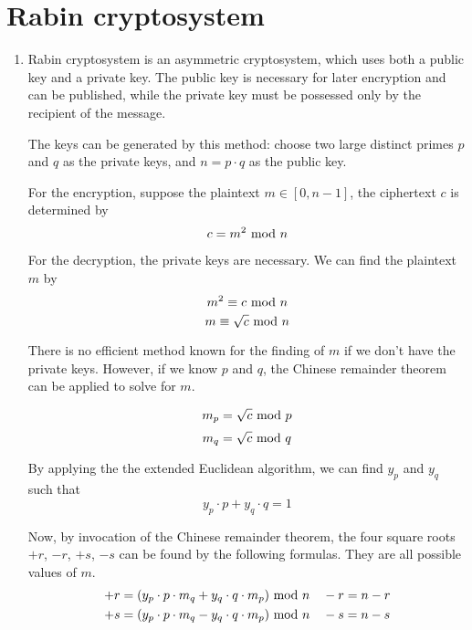 \documentclass{article}
\renewcommand{\mod}{{\rm\ mod\ }}
\begin{document}
\section{Rabin cryptosystem}
\begin{enumerate}
\item
Rabin cryptosystem is an asymmetric cryptosystem, which uses both a public key and a private key. The public key is necessary for later encryption and can be published, while the private key must be possessed only by the recipient of the message. 

The keys can be generated by this method: choose two large distinct primes $p$ and $q$ as the private keys, and $n=p\cdot q$ as the public key.

For the encryption, suppose the plaintext $m\in[0,n-1]$, the ciphertext $c$ is determined by $$c=m^2\mod n$$

For the decryption, the private keys are necessary. We can find the plaintext $m$ by $$m^2\equiv c\mod n$$ $$m\equiv \sqrt{c}\mod n$$

There is no efficient method known for the finding of $m$ if we don't have the private keys. However, if we know $p$ and $q$, the Chinese remainder theorem can be applied to solve for $m$.

$$m_p=\sqrt{c}\mod p$$
$$m_q=\sqrt{c}\mod q$$

By applying the the extended Euclidean algorithm, we can find $y_{p}$ and $y_{q}$ such that $$y_p\cdot p+y_q\cdot q=1$$

Now, by invocation of the Chinese remainder theorem, the four square roots $+r$, $-r$, $+s$, $-s$ can be found by the following formulas. They are all possible values of $m$.
\begin{align*}
+r=(y_p\cdot p\cdot m_q+y_q\cdot q\cdot m_p)\mod n & \quad -r=n-r\\
+s=(y_p\cdot p\cdot m_q-y_q\cdot q\cdot m_p)\mod n & \quad -s=n-s
\end{align*}


\end{enumerate}
\end{document}
